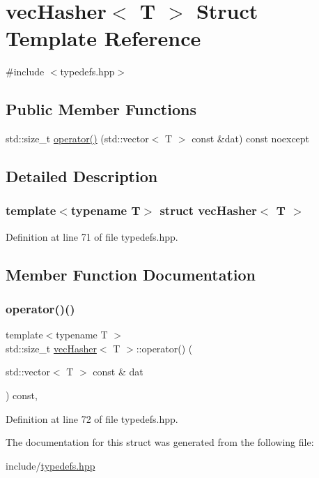 \hypertarget{structvec_hasher}{}\section{vec\+Hasher$<$ T $>$ Struct Template Reference}
\label{structvec_hasher}


{\ttfamily \#include $<$typedefs.\+hpp$>$}

\subsection*{Public Member Functions}
\begin{DoxyCompactItemize}
\item 
std\+::size\+\_\+t \hyperlink{structvec_hasher_ae8127d9b7d302fe59bd64e7067e7ba61}{operator()} (std\+::vector$<$ T $>$ const \&dat) const noexcept
\end{DoxyCompactItemize}


\subsection{Detailed Description}
\subsubsection*{template$<$typename T$>$\newline
struct vec\+Hasher$<$ T $>$}



Definition at line 71 of file typedefs.\+hpp.



\subsection{Member Function Documentation}
\mbox{\label{structvec_hasher_ae8127d9b7d302fe59bd64e7067e7ba61}} 
\subsubsection{\texorpdfstring{operator()()}{operator()()}}
{\footnotesize\ttfamily template$<$typename T $>$ \\
std\+::size\+\_\+t \hyperlink{structvec_hasher}{vec\+Hasher}$<$ T $>$\+::operator() (\begin{DoxyParamCaption}\item[{std\+::vector$<$ T $>$ const \&}]{dat }\end{DoxyParamCaption}) const\hspace{0.3cm}{\ttfamily [inline]}, {\ttfamily [noexcept]}}



Definition at line 72 of file typedefs.\+hpp.



The documentation for this struct was generated from the following file\+:\begin{DoxyCompactItemize}
\item 
include/\hyperlink{typedefs_8hpp}{typedefs.\+hpp}\end{DoxyCompactItemize}
